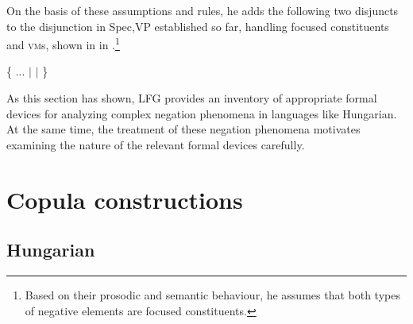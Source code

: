 \documentclass[output=paper,hidelinks]{langscibook}
\begin{document}
\ea%
    \label{ex:FinnoUgric:17}
\z
    On the basis of these assumptions and rules, he adds the following two disjuncts to the disjunction in Spec,VP established so far, handling focused constituents and \textsc{vm}s, shown in  in .\footnote{Based on their prosodic and semantic behaviour, he assumes that both types of negative elements are focused constituents.}

\ea%
\label{ex:FinnoUgric:18}
{\small \{ ... $\mid$
$\mid$ \}}
\z

As this section has shown, LFG provides an inventory of appropriate formal devices for analyzing complex negation phenomena in languages like Hungarian. At the same time, the treatment of these negation phenomena motivates examining the nature of the relevant formal devices carefully.

\section{Copula constructions}
\label{sec:FinnoUgric:5}

\subsection{Hungarian}
\label{sec:FinnoUgric:5.1}
\end{document}
